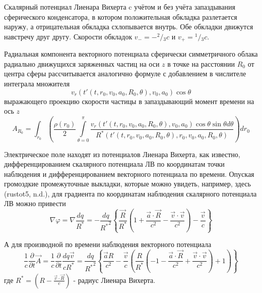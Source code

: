 \documentclass[12pt]{article}
\begin{document}
Скалярный потенциал Лиенара Вихерта c учётом и без учёта запаздывания сферического конденсатора, в котором положительная обкладка разлетается наружу, а отрицательная обкладка схлопывается внутрь. Обе обкладки движутся навстречу друг другу. Скорости обкладок ${{v}_{-}}=-{}^{2}/{}_{3}c$ и ${{v}_{+}}={}^{1}/{}_{3}c$.

Радиальная компонента векторного потенциала сферически симметричного облака радиально движущихся заряженных частиц на оси $z$ в точке на расстоянии ${{R}_{0}}$ от центра сферы рассчитывается аналогично формуле  с добавлением в числителе интеграла множителя \[{{v}_{r}}\left( t'\left( t,{{r}_{0}},{{v}_{0}},{{a}_{0}},{{R}_{0}},\theta  \right),{{v}_{0}},{{a}_{0}} \right)\cos \theta \] выражающего проекцию скорости частицы в запаздывающий момент времени на ось $z$ 
	\[{{A}_{{{R}_{0}}}}=\int_{{{r}_{0}}}{\left( \frac{\rho \left( {{r}_{0}} \right)}{2}\int\limits_{\theta =0}^{\pi }{\frac{{{v}_{r}}\left( t'\left( t,{{r}_{0}},{{v}_{0}},{{a}_{0}},{{R}_{0}},\theta  \right),{{v}_{0}},{{a}_{0}} \right)\cos \theta \sin \theta d\theta }{{{R}^{*}}\left( t'\left( t,{{r}_{0}},{{v}_{0}},{{a}_{0}},{{R}_{0}},\theta  \right),{{r}_{0}},{{v}_{0}},{{a}_{0}},{{R}_{0}},\theta  \right)}} \right)}d{{r}_{0}}\] 	

Электрическое поле находят из потенциалов Лиенара Вихерта, как известно, дифференцированием скалярного потенциала ЛВ по координатам точки наблюдения и дифференцированием векторного потенциала по времени. Опуская громоздкие промежуточные выкладки, которые можно увидеть, например, здесь (rustot5, n.d.), для градиента по координатам наблюдения скалярного потенциала ЛВ можно привести
	\[\nabla \varphi =\nabla \frac{dq}{{{R}^{*}}}=-\frac{dq}{{{R}^{*}}^{2}}\left\{ \frac{\overrightarrow{R}}{{{R}^{*}}}\left( 1+\frac{\overrightarrow{a}\cdot \overrightarrow{R}}{{{c}^{2}}}-\frac{\overrightarrow{v}\cdot \overrightarrow{v}}{{{c}^{2}}} \right)-\frac{\overrightarrow{v}}{c} \right\}\] 	

А для производной по времени наблюдения векторного потенциала 
	\[\frac{1}{c}\frac{\partial }{\partial t}\overrightarrow{A}=\frac{1}{c}\frac{\partial }{\partial t}\frac{dq\overrightarrow{v}}{c{{R}^{*}}}=\frac{dq}{{{R}^{*}}^{2}}\left\{ \frac{\overrightarrow{a}R}{{{c}^{2}}}-\frac{\overrightarrow{v}}{c}\left( \frac{R}{{{R}^{*}}}\left( -1-\frac{\overrightarrow{a}\cdot \overrightarrow{R}}{{{c}^{2}}}+\frac{\overrightarrow{v}\cdot \overrightarrow{v}}{{{c}^{2}}} \right)+1 \right) \right\}\] 	
где ${{R}^{*}}=\left( R-\frac{\overrightarrow{v}\cdot \overrightarrow{R}}{c} \right)$ - радиус Лиенара Вихерта.
\end{document}
